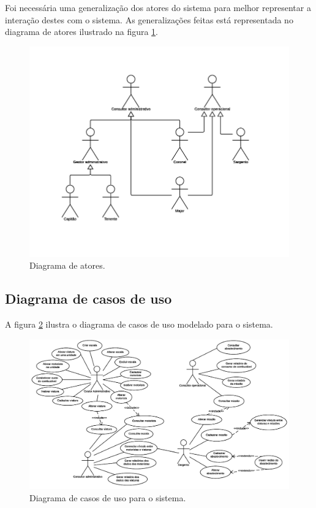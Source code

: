       Foi necessária uma generalização dos atores do sistema para melhor representar a interação destes com o sistema. As generalizações
      feitas está representada no diagrama de atores ilustrado na figura \ref{diagrama_de_atores}.
      
      \begin{figure}[!htbp]
	\centering
	\includegraphics[scale=1]{figuras/diagrama_de_atores}
	\caption[Diagrama de atores]{Diagrama de atores.}
	\label{diagrama_de_atores}
      \end{figure}
    
    \vfill
    \pagebreak
    \subsection{Diagrama de casos de uso}
      
      A figura \ref{diagrama_de_casos_uso} ilustra o diagrama de casos de uso modelado para o sistema.
      
      \begin{figure}[!htbp]
	\centering
	\includegraphics[scale=0.85]{figuras/diagrama_de_casos_uso}
	\caption[Diagrama de casos de uso para o sistema]{Diagrama de casos de uso para o sistema.}
	\label{diagrama_de_casos_uso}
      \end{figure}
    
